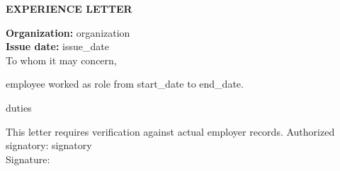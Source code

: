 \documentclass[11pt,a4paper]{article}
\begin{document}
\begin{center}{\Large\bfseries EXPERIENCE LETTER}\end{center}
\textbf{Organization:} {{organization}}\\
\textbf{Issue date:} {{issue_date}}\\[5mm]
To whom it may concern,

{{employee}} worked as {{role}} from {{start_date}} to {{end_date}}.
\par\bigskip
{{duties}}
\par\bigskip
This letter requires verification against actual employer records.
\vspace{20mm}
Authorized signatory: {{signatory}}\\[10mm]
Signature:\ \hrulefill
\end{document}
